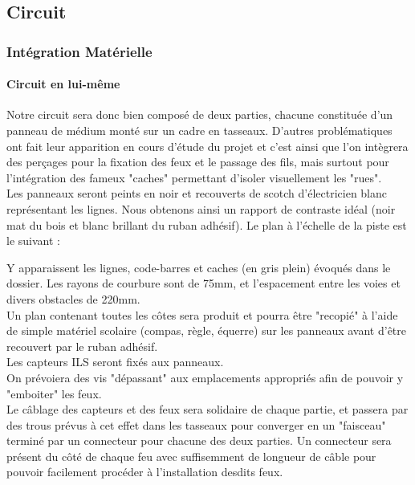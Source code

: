 \subsection{Circuit}

	\subsubsection{Intégration Matérielle}

		\paragraph{Circuit en lui-même}
			Notre circuit sera donc bien composé de deux parties, chacune constituée d'un panneau de médium monté sur un cadre en tasseaux.
			D'autres problématiques ont fait leur apparition en cours d'étude du projet et c'est ainsi que l'on intègrera des perçages pour la fixation des feux et le passage des fils, mais surtout pour l'intégration des fameux "caches" permettant d'isoler visuellement les "rues".\\

			Les panneaux seront peints en noir et recouverts de scotch d'électricien blanc représentant les lignes. Nous obtenons ainsi un rapport de contraste idéal (noir mat du bois et blanc brillant du ruban adhésif). Le plan à l'échelle de la piste est le suivant :

			\vspace{15pt}

			Y apparaissent les lignes, code-barres et caches (en gris plein) évoqués dans le dossier. Les rayons de courbure sont de 75mm, et l'espacement entre les voies et divers obstacles de 220mm.\\

			Un plan contenant toutes les côtes sera produit et pourra être "recopié" à l'aide de simple matériel scolaire (compas, règle, équerre) sur les panneaux avant d'être recouvert par le ruban adhésif.\\

			Les capteurs ILS seront fixés aux panneaux.\\
			On prévoiera des vis "dépassant" aux emplacements appropriés afin de pouvoir y "emboiter" les feux.\\

			Le câblage des capteurs et des feux sera solidaire de chaque partie, et passera par des trous prévus à cet effet dans les tasseaux pour converger en un "faisceau" terminé par un connecteur pour chacune des deux parties. Un connecteur sera présent du côté de chaque feu avec suffisemment de longueur de câble pour pouvoir facilement procéder à l'installation desdits feux.

